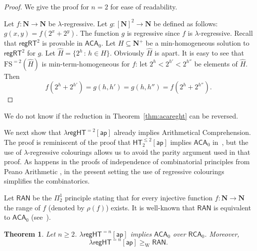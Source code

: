 \documentclass[a4paper,11pt]{article}
\newtheorem{theorem}{Theorem}
\newcommand\Nat{\mathbf{N}}
\newcommand\RCA{\mathsf{RCA}}
\newcommand\ACA{\mathsf{ACA}}
\newcommand\HT{\mathsf{HT}}
\newcommand\regHT{\mathsf{regHT}}
\newcommand\REG{\mathsf{regRT}}
\newcommand\FS{\mathrm{FS}}
\newcommand\W{\mathrm{W}}
\newcommand\ap{\mathsf{ap}}
\newcommand\RAN{\mathsf{RAN}}
\begin{document}
\begin{proof}
We give the proof for $n=2$ for ease of readability. 


Let $f:\Nat \to \Nat$ be $\lambda$-regressive. 
Let $g:[\Nat]^2 \to \Nat$ be defined as follows: $g(x,y) = f(2^x+2^y)$. 
The function $g$ is regressive since $f$ is 
$\lambda$-regressive. Recall that $\REG^2$ is provable in $\ACA_0$.
Let $H\subseteq \Nat^+$ be a min-homogeneous solution to $\REG^2$ for $g$. Let $\hat{H} = \{ 2^h \,:\, h \in H\}$. Obviously $\hat{H}$ is apart. It is easy to see that $\FS^{= 2}(\hat{H})$ is min-term-homogeneous for $f$: let $2^h < 2^{h'} < 2^{h''}$ be elements of $\hat{H}$. Then 
$$ f(2^h+2^{h'}) = g(h,h')=g(h,h'') = f(2^h+2^{h''}).$$

\end{proof}

We do not know if the reduction in Theorem~\ref{thm:acareght} can be reversed. 

We next show that $\lambda\regHT^{=2}[\ap]$ already implies Arithmetical Comprehension. The proof is reminiscent of the proof that $\HT^{\leq 2}_2[\ap]$ implies $\ACA_0$ in~\cite{Car-Kol-Lep-Zda:20}, but the use of $\lambda$-regressive colourings allows us to avoid the parity argument used in that proof. As happens in the proofs of independence of combinatorial principles from 
Peano Arithmetic \cite{Kan-McA:87}, in the present setting the use of regressive colourings simplifies the combinatorics.  

Let $\RAN$ be the $\Pi^1_2$ principle stating that for every injective function $f:\Nat\to \Nat$ the range of $f$ (denoted by $\rho(f)$) exists. It is well-known 
that $\RAN$ is equivalent to $\ACA_0$ (see~\cite{Sim:SOSOA}).

\begin{theorem}\label{thm:regtoaca}
Let $n\geq 2$.
$\lambda\regHT^{= n}[\ap]$ implies $\ACA_0$ over $\RCA_0$. Moreover, 
$$\lambda\regHT^{=n}[\ap]\geq_\W \RAN.$$
\end{theorem}
\end{document}
